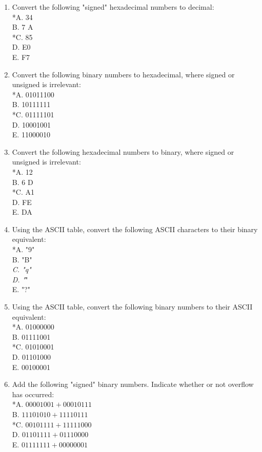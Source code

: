 \documentclass[10pt]{book}
\begin{document}
\begin{center}
\begin{center}
\begin{center}
\begin{center}
\begin{center}
\begin{enumerate}
*A. 18\\
B. 100\\
*C. -79\\
D. -112\\
E. -247
  \item Convert the following "signed" hexadecimal numbers to decimal:\\
*A. 34\\
B. 7 A\\
*C. 85\\
D. E0\\
E. F7
  \item Convert the following binary numbers to hexadecimal, where signed or unsigned is irrelevant:\\
*A. 01011100\\
B. 10111111\\
*C. 01111101\\
D. 10001001\\
E. 11000010
  \item Convert the following hexadecimal numbers to binary, where signed or unsigned is irrelevant:\\
*A. 12\\
B. 6 D\\
*C. A1\\
D. FE\\
E. DA
  \item Using the ASCII table, convert the following ASCII characters to their binary equivalent:\\
*A. "9"\\
B. "B"\\
\textit{C. "q"\\
D. "}"\\
E. "?"
  \item Using the ASCII table, convert the following binary numbers to their ASCII equivalent:\\
*A. 01000000\\
B. 01111001\\
*C. 01010001\\
D. 01101000\\
E. 00100001
  \item Add the following "signed" binary numbers. Indicate whether or not overflow has occurred:\\
*A. $00001001+00010111$\\
B. $11101010+11110111$\\
*C. $00101111+11111000$\\
D. $01101111+01110000$\\
E. $01111111+00000001$

\end{enumerate}
\end{center}
\end{center}
\end{center}
\end{center}
\end{center}
\end{document}
